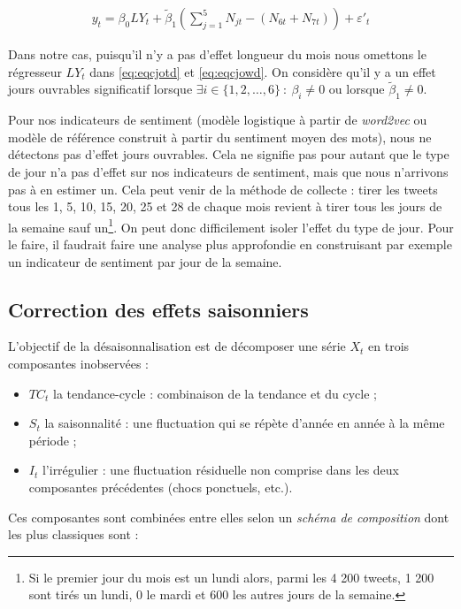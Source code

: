 \documentclass[11pt,french,french]{article}
\let\rmarkdownfootnote\footnote%
\def\footnote{\protect\rmarkdownfootnote}
\begin{document}
\begin{eqnarray}
y_t=\beta_0 LY_t + \tilde\beta_1 \left(\sum_{j=1}^{5}N_{jt} - (N_{6t} + N_{7t})\right) + \varepsilon'_t
\label{eq:eqcjowd}
\end{eqnarray}

Dans notre cas, puisqu'il n'y a pas d'effet longueur du mois nous
omettons le régresseur \(LY_t\) dans \eqref{eq:eqcjotd} et
\eqref{eq:eqcjowd}. On considère qu'il y a un effet jours ouvrables
significatif lorsque \(\exists i\in \{1,2,\dots,6\}\::\:\beta_i\ne0\) ou
lorsque \(\tilde\beta_1\ne0\).

\faArrowCircleRight{} Pour nos indicateurs de sentiment (modèle
logistique à partir de \emph{word2vec} ou modèle de référence construit
à partir du sentiment moyen des mots), nous ne détectons pas d'effet
jours ouvrables. Cela ne signifie pas pour autant que le type de jour
n'a pas d'effet sur nos indicateurs de sentiment, mais que nous
n'arrivons pas à en estimer un. Cela peut venir de la méthode de
collecte : tirer les tweets tous les 1, 5, 10, 15, 20, 25 et 28 de
chaque mois revient à tirer tous les jours de la semaine sauf
un\footnote{Si le premier jour du mois est un lundi alors, parmi les 4
  200 tweets, 1 200 sont tirés un lundi, 0 le mardi et 600 les autres
  jours de la semaine.}. On peut donc difficilement isoler l'effet du
type de jour. Pour le faire, il faudrait faire une analyse plus
approfondie en construisant par exemple un indicateur de sentiment par
jour de la semaine.

\subsection{Correction des effets saisonniers}\label{sec:cvs}

L'objectif de la désaisonnalisation est de décomposer une série \(X_t\)
en trois composantes inobservées :

\begin{itemize}
\item
  \(TC_t\) la tendance-cycle : combinaison de la tendance et du cycle ;
\item
  \(S_t\) la saisonnalité : une fluctuation qui se répète d'année en
  année à la même période ;
\item
  \(I_t\) l'irrégulier : une fluctuation résiduelle non comprise dans
  les deux composantes précédentes (chocs ponctuels, etc.).
\end{itemize}

Ces composantes sont combinées entre elles selon un \emph{schéma de
composition} dont les plus classiques sont :
\end{document}
